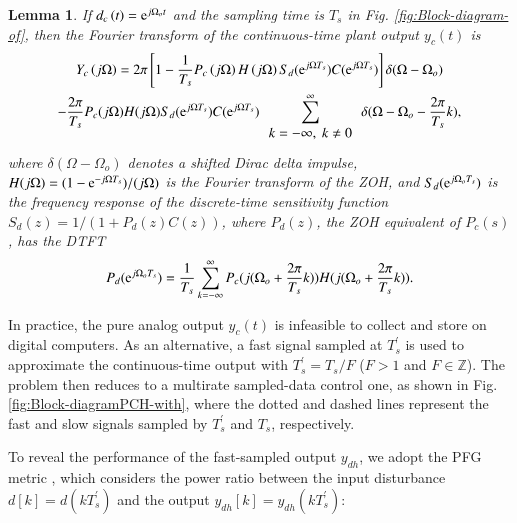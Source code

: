 \documentclass [11pt, proquest] {uwthesis}[2020/02/24]
\newtheorem{lemma}{Lemma}
\begin{document}
\begin{lemma} \cite{astrom_computer-controlled_1996} If $d_{c}\left(t\right)=\mathrm{e}^{j\Omega_{o}t}$
and the sampling time is $T_{s}$ in Fig. \ref{fig:Block-diagram-of},
then the Fourier transform of the continuous-time plant output $y_{c}(t)$
is
\begin{multline}
Y_{c}\left(j\Omega\right)=2\pi\left[1-\frac{1}{T_{s}}P_{c}\left(j\Omega\right)H\left(j\Omega\right)S_{d}(\e^{j\Omega T_{s}})C(\e^{j\Omega T_{s}})\right]\delta(\Omega-\Omega_{o})\\
-\frac{2\pi}{T_{s}}P_{c}(j\Omega)H(j\Omega)S_{d}(\e^{j\Omega T_{s}})C(\e^{j\Omega T_{s}})\sum_{\begin{array}{c}
k=-\infty,\ k\neq0\end{array}}^{\infty}\delta(\Omega-\Omega_{o}-\frac{2\pi}{T_{s}}k),\label{eq:distAtt}
\end{multline}
where $\delta\left(\Omega-\Omega_{o}\right)$ denotes a shifted Dirac
delta impulse, $H(j\Omega)=(1-\mathrm{e}^{-j\Omega T_{s}})/(j\Omega)$ is
the Fourier transform of the ZOH, and $S_{d}(\mathrm{e}^{j\Omega_{o}T_{s}})$
is the frequency response of the discrete-time sensitivity function
$S_{d}(z)=1/(1+P_{d}(z)C(z))$, where $P_{d}(z)$, the ZOH equivalent
of $P_{c}(s)$, has the DTFT
\begin{equation}
P_{d}(\mathrm{e}^{j\Omega_{o}T_{s}})=\frac{1}{T_{s}}\sum_{k=-\infty}^{\infty}P_{c}(j(\Omega_{o}+\frac{2\pi}{T_{s}}k))H(j(\Omega_{o}+\frac{2\pi}{T_{s}}k)).\label{eq:Gamma-1}
\end{equation}
\end{lemma}

In practice, the pure analog output $y_{c}(t)$ is infeasible to collect
and store on digital computers. As an alternative, a fast signal sampled
at $T_{s}^{'}$ is used to approximate the continuous-time output
with $T_{s}^{'}=T_{s}/F$ ($F>1$ and $F\in\mathbb{Z}$). The problem
then reduces to a multirate sampled-data control one, as shown
in Fig. \ref{fig:Block-diagramPCH-with}, where the dotted and dashed
lines represent the fast and slow signals sampled by $T_{s}^{'}$
and $T_{s}$, respectively.

To reveal the performance of the fast-sampled output $y_{dh}$, we
adopt the PFG metric \cite{lindgarde1997performance}, which considers
the power ratio between the input disturbance $d[k]=d(kT_{s}^{'})$
and the output $y_{dh}[k]=y_{dh}(kT_{s}^{'})$:
\end{document}
